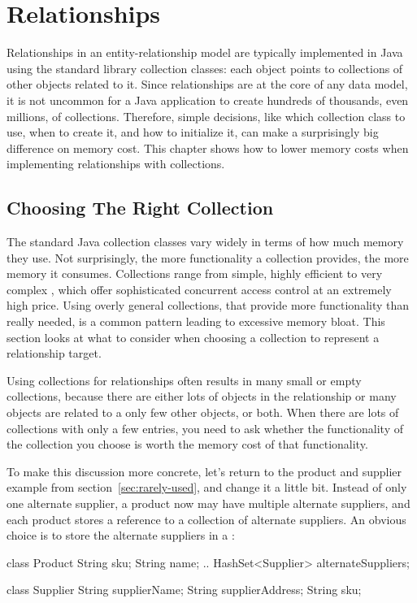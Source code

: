 \chapter{Relationships}
\label{chapter:representing-relationships}

Relationships in an
entity-relationship model are typically implemented in Java using the
standard library collection classes:
each object points to collections of other objects related to it.
Since relationships are at the core of any data model, it
 is not uncommon for a Java application to create hundreds of
thousands, even millions, of collections. Therefore, simple decisions, like
which collection class to use, when to create it, and how to initialize it,
can make a surprisingly big difference on memory cost.
This chapter shows
 how to lower memory costs when implementing relationships with collections.
 
 \section{Choosing The Right Collection}
 \label{section:choosing-collection}


The standard Java collection classes vary widely in terms of how much memory they use.
Not surprisingly, the more functionality a collection provides, the more
memory it consumes. Collections range from simple, highly efficient
 to very complex
, which offer sophisticated concurrent access
control at an extremely high price. 
Using overly general collections, that provide more functionality than
really needed, is a common pattern leading to excessive memory bloat.
This section looks at what to consider when choosing a collection to
represent a relationship target. 

Using collections for relationships often results in many small or empty
collections, because there are either lots of objects in the relationship or
 many objects are related to a only few other objects, or both. When there
are lots of collections with only a few entries, you need to ask  whether the
functionality of the collection you choose is worth the memory cost of that
functionality.

To make this discussion more concrete, let's return to the product and supplier example 
from section~\ref{sec:rarely-used}, and change it a little
 bit. Instead of only one alternate supplier, a product now may have multiple
 alternate suppliers, and each product stores a reference to a collection of alternate suppliers. An obvious choice is
 to store the alternate suppliers in a :
 \begin{shortlisting} 
class Product {
	String sku;
	String name;
	.. 
	HashSet<Supplier> alternateSuppliers;
}

class Supplier {
	String supplierName;
	String supplierAddress;
	String sku;
}
\end{shortlisting}
 

